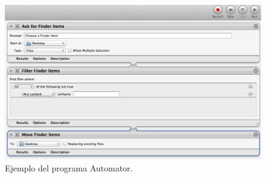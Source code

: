 \begin{figure}
\centering
\includegraphics[width=\linewidth]{../graphics/fig_flujo_trabajo_automator.png}
\caption{Ejemplo del programa Automator.}\label{fig:flujo_trabajo_automator}
\end{figure}